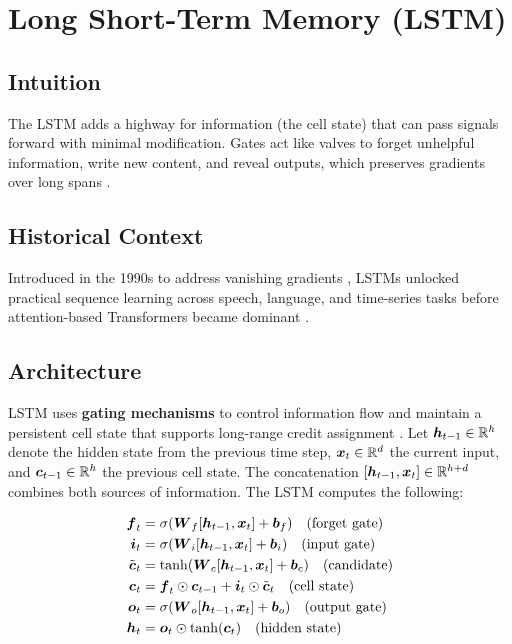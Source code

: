 
\section{Long Short-Term Memory (LSTM) }
\label{sec:lstm}

\subsection*{Intuition}

The LSTM adds a highway for information (the cell state) that can pass signals forward with minimal modification. Gates act like valves to forget unhelpful information, write new content, and reveal outputs, which preserves gradients over long spans \cite{Hochreiter1997,GoodfellowEtAl2016}.

\subsection*{Historical Context}

Introduced in the 1990s to address vanishing gradients \cite{Hochreiter1997}, LSTMs unlocked practical sequence learning across speech, language, and time-series tasks before attention-based Transformers became dominant \cite{Vaswani2017}.


\subsection{Architecture}

LSTM uses \textbf{gating mechanisms} to control information flow and maintain a persistent cell state that supports long-range credit assignment \cite{Hochreiter1997,GoodfellowEtAl2016}. Let $\boldsymbol{h}_{t-1} \in \mathbb{R}^h$ denote the hidden state from the previous time step, $\boldsymbol{x}_t \in \mathbb{R}^d$ the current input, and $\boldsymbol{c}_{t-1} \in \mathbb{R}^h$ the previous cell state. The concatenation $[\boldsymbol{h}_{t-1}, \boldsymbol{x}_t] \in \mathbb{R}^{h+d}$ combines both sources of information. The LSTM computes the following:

\begin{align}
\boldsymbol{f}_t &= \sigma(\boldsymbol{W}_f [\boldsymbol{h}_{t-1}, \boldsymbol{x}_t] + \boldsymbol{b}_f) \quad \text{(forget gate)} \\
\boldsymbol{i}_t &= \sigma(\boldsymbol{W}_i [\boldsymbol{h}_{t-1}, \boldsymbol{x}_t] + \boldsymbol{b}_i) \quad \text{(input gate)} \\
\tilde{\boldsymbol{c}}_t &= \tanh(\boldsymbol{W}_c [\boldsymbol{h}_{t-1}, \boldsymbol{x}_t] + \boldsymbol{b}_c) \quad \text{(candidate)} \\
\boldsymbol{c}_t &= \boldsymbol{f}_t \odot \boldsymbol{c}_{t-1} + \boldsymbol{i}_t \odot \tilde{\boldsymbol{c}}_t \quad \text{(cell state)} \\
\boldsymbol{o}_t &= \sigma(\boldsymbol{W}_o [\boldsymbol{h}_{t-1}, \boldsymbol{x}_t] + \boldsymbol{b}_o) \quad \text{(output gate)} \\
\boldsymbol{h}_t &= \boldsymbol{o}_t \odot \tanh(\boldsymbol{c}_t) \quad \text{(hidden state)}
\end{align}

